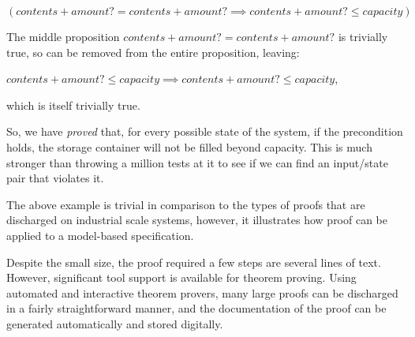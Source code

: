 \begin{example}
\quad\quad $(contents + amount? = contents + amount? \implies contents + amount? \leq capacity)$

The middle proposition $contents + amount? = contents + amount?$ is trivially true, so can be removed from the entire proposition, leaving:

\quad  $contents + amount? \leq capacity \implies contents + amount? \leq capacity $,

which is itself trivially true.

So, we have \emph{proved} that, for every possible state of the system, if the precondition holds, the storage container will not be filled beyond capacity. This is much stronger than throwing a million tests at it to see if we can find an input/state pair that violates it.

\end{example}

The above example is trivial in comparison to the types of proofs that are discharged on industrial scale systems, however, it illustrates how proof can be applied to a model-based specification.

Despite the small size, the proof required a few steps are several lines of text.  However, significant tool support is available for theorem proving. Using automated and interactive theorem provers, many large proofs can be discharged in a fairly straightforward manner, and the documentation of the proof can be generated automatically and stored digitally.


